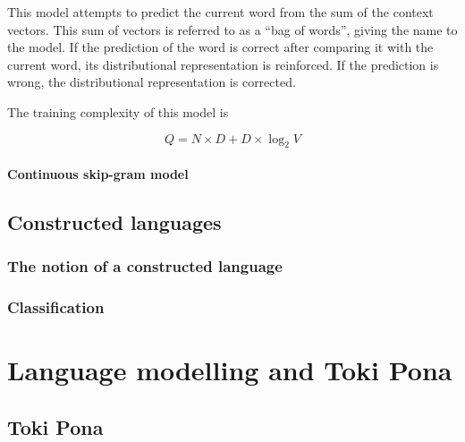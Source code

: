 \documentclass[14pt, a4paper]{extreport}
\begin{document}
This model attempts to predict the current word from the sum of the context vectors. This sum of vectors is referred to as a ``bag of words'', giving the name to the model. If the prediction of the word is correct after comparing it with the current word, its distributional representation is reinforced. If the prediction is wrong, the distributional representation is corrected.

The training complexity of this model is

\[Q = N \times D + D \times \log_2{V}\]

\subsubsection{Continuous skip-gram model}






%

\section{Constructed languages}

\subsection{The notion of a constructed language}

\subsection{Classification}


\chapter{Language modelling and Toki Pona}

\section{Toki Pona}
\end{document}
